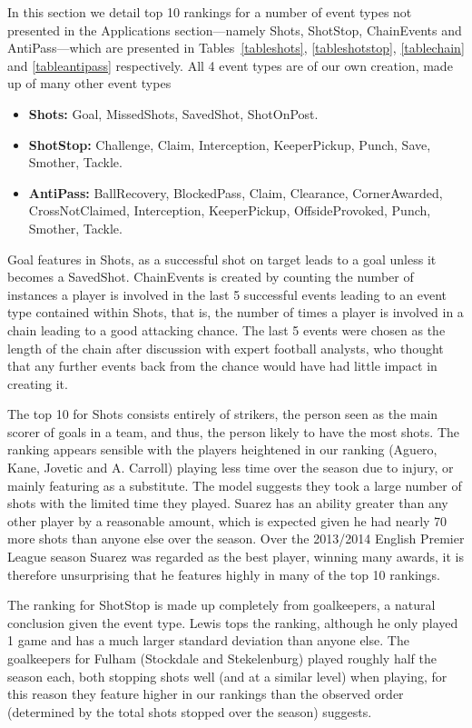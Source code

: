 \documentclass[11pt,a4paper]{article}
\begin{document}
In this section we detail top 10 rankings for a number of event types 
not presented in the Applications section---namely Shots, ShotStop, 
ChainEvents and AntiPass---which are presented in Tables~\ref{tableshots}, 
\ref{tableshotstop}, \ref{tablechain} and \ref{tableantipass} 
respectively. All 4 event types are of our own creation, made up of 
many other event types
\begin{itemize}
\item \textbf{Shots:} Goal, MissedShots, SavedShot, ShotOnPost.
\item \textbf{ShotStop:} Challenge, Claim, Interception, KeeperPickup, 
Punch, Save, Smother, Tackle.
\item \textbf{AntiPass:} BallRecovery, BlockedPass, Claim, Clearance, 
CornerAwarded, CrossNotClaimed, Interception, KeeperPickup, 
OffsideProvoked, Punch, Smother, Tackle.
\end{itemize}
Goal features in Shots, as a successful shot on target leads to a goal 
unless it becomes a SavedShot. ChainEvents is created by counting the 
number of instances a player is involved in the last 5 successful 
events leading to an event type contained within Shots, that is, the 
number of times a player is involved in a chain leading to a good 
attacking chance. The last 5 events were chosen as the length of the 
chain after discussion with expert football analysts, who thought that 
any further events back from the chance would have had little impact 
in creating it.

The top 10 for Shots consists entirely of strikers, the person seen as 
the main scorer of goals in a team, and thus, the person likely to have 
the most shots. The ranking appears sensible with the players 
heightened in our ranking (Aguero, Kane, Jovetic and A. Carroll) 
playing less time over the season due to injury, or mainly featuring 
as a substitute. The model suggests they took a large number of shots 
with the limited time they played. Suarez has an ability greater than 
any other player by a reasonable amount, which is expected given 
he had nearly 70 more shots than anyone else over the season. Over the 
2013/2014 English Premier League season Suarez was regarded as the 
best player, winning many awards, it is therefore unsurprising that he 
features highly in many of the top 10 rankings. 

The ranking for ShotStop is made up completely from goalkeepers, a 
natural conclusion given the event type. Lewis tops the ranking, 
although he only played 1 game and has a much larger standard deviation 
than anyone else. The goalkeepers for Fulham (Stockdale and 
Stekelenburg) played roughly half the season each, both stopping shots 
well (and at a similar level) when playing, for this reason they 
feature higher in our rankings than the observed order (determined by 
the total shots stopped over the season) suggests.
\end{document}
